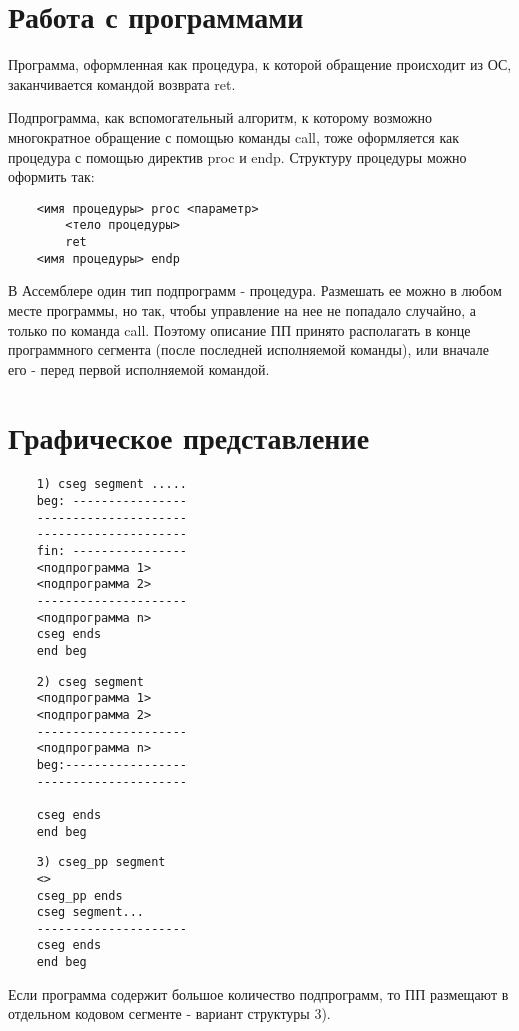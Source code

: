 \section{Работа с программами}

Программа, оформленная как процедура, к которой обращение происходит из ОС, заканчивается командой возврата ret.

Подпрограмма, как вспомогательный алгоритм, к которому возможно многократное обращение с помощью команды call,
тоже оформляется как процедура с помощью директив proc и endp. Структуру процедуры можно оформить так:

\begin{verbatim}
    <имя процедуры> proc <параметр>
        <тело процедуры>
        ret
    <имя процедуры> endp
\end{verbatim}

В Ассемблере один тип подпрограмм - процедура. Размешать ее можно в любом месте программы, но так, чтобы управление на нее не попадало случайно, а только по команда call.
Поэтому описание ПП принято располагать в конце программного сегмента (после последней исполняемой команды), или вначале его - перед первой исполняемой командой.

\section{Графическое представление}

\begin{verbatim}
    1) cseg segment .....
    beg: ----------------
    ---------------------
    ---------------------
    fin: ----------------
    <подпрограмма 1>
    <подпрограмма 2>
    ---------------------
    <подпрограмма n>
    cseg ends
    end beg
\end{verbatim}

\begin{verbatim}
    2) cseg segment
    <подпрограмма 1>
    <подпрограмма 2>
    ---------------------
    <подпрограмма n>
    beg:-----------------
    ---------------------

    cseg ends
    end beg
\end{verbatim}

\begin{verbatim}
    3) cseg_pp segment
    <>
    cseg_pp ends
    cseg segment...
    ---------------------
    cseg ends
    end beg
\end{verbatim}

Если программа содержит большое количество подпрограмм, то ПП размещают в отдельном кодовом сегменте - вариант структуры 3).

